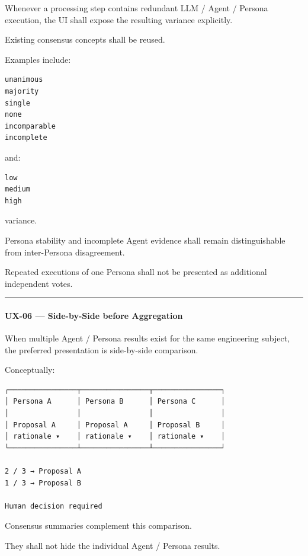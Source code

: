 Whenever a processing step contains redundant LLM / Agent / Persona execution, the UI shall expose the resulting variance explicitly.

Existing consensus concepts shall be reused.

Examples include:

\begin{verbatim}
unanimous
majority
single
none
incomparable
incomplete
\end{verbatim}

and:

\begin{verbatim}
low
medium
high
\end{verbatim}

variance.

Persona stability and incomplete Agent evidence shall remain distinguishable from inter-Persona disagreement.

Repeated executions of one Persona shall not be presented as additional independent votes.

\begin{center}\rule{0.5\linewidth}{0.5pt}\end{center}

\hypertarget{ux-06--side-by-side-before-aggregation}{%
\paragraph{UX-06 --- Side-by-Side before Aggregation}\label{ux-06--side-by-side-before-aggregation}}

When multiple Agent / Persona results exist for the same engineering subject, the preferred presentation is side-by-side comparison.

Conceptually:

\begin{verbatim}
┌────────────────┬────────────────┬────────────────┐
│ Persona A      │ Persona B      │ Persona C      │
│                │                │                │
│ Proposal A     │ Proposal A     │ Proposal B     │
│ rationale ▾    │ rationale ▾    │ rationale ▾    │
└────────────────┴────────────────┴────────────────┘

2 / 3 → Proposal A
1 / 3 → Proposal B

Human decision required
\end{verbatim}

Consensus summaries complement this comparison.

They shall not hide the individual Agent / Persona results.

